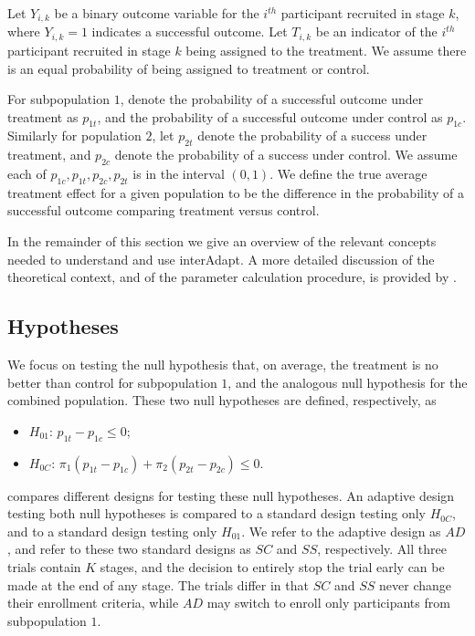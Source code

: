 \documentclass[article]{jss}
\begin{document}
Let $Y_{i,k}$ be a binary outcome variable for the $i^{th}$ participant recruited in stage $k$, where $Y_{i,k}=1$ indicates a successful outcome. Let $T_{i,k}$ be an indicator of   the $i^{th}$ participant recruited in stage $k$ being assigned to the treatment. We assume there is an equal probability of being assigned to  treatment or control.

For subpopulation $1$, denote the probability of a successful outcome under treatment as $p_{1t}$, and the probability of a successful outcome under control as $p_{1c}$. Similarly for population $2$, let $p_{2t}$ denote the probability of a success under treatment, and $p_{2c}$ denote the probability of a success under control. 
We assume each of $p_{1c},p_{1t},p_{2c},p_{2t}$ is in the interval $(0,1)$.
We define the true average treatment effect for a given population to be the difference in the probability of a successful outcome comparing treatment versus control.


In the remainder of this section we give an overview of the relevant concepts needed to understand and use \textsf{interAdapt}. A more detailed discussion of the theoretical context, and of the parameter calculation procedure, is provided by \cite{Rosenblum2013AdaptMISTIE}.
 
\subsection{Hypotheses}
\label{sub:hypotheses}
We focus on testing the null hypothesis that, on average, the treatment is no better than control for subpopulation $1$, and the analogous null hypothesis for the combined population. These two null hypotheses are defined, respectively, as

\begin{itemize}
\item $H_{01}$: $p_{1t}-p_{1c}≤0$;%
\item $H_{0C}$: $π_1(p_{1t}-p_{1c}) + π_2(p_{2t}-p_{2c}) ≤ 0$. %
\end{itemize}
 compares different designs for testing these null hypotheses. 
An adaptive design testing both null hypotheses is compared to a standard design testing only $H_{0C}$, and to a standard design testing only $H_{01}$. 
We refer to the adaptive design as $AD$, and refer to these two standard designs as $SC$ and $SS$, respectively. All three trials contain $K$ stages, and the decision to entirely stop the trial early can be made at the end of any stage. The trials differ in that $SC$ and $SS$ never change their enrollment criteria, while $AD$ may switch to enroll only participants from subpopulation $1$.
\end{document}
